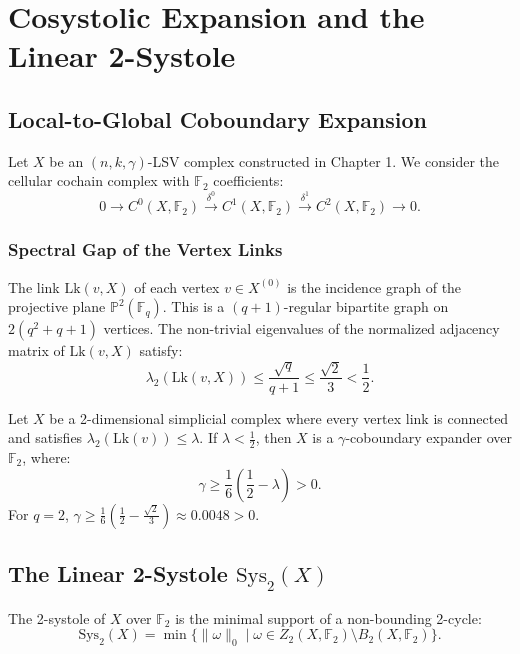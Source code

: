 \chapter{Cosystolic Expansion and the Linear 2-Systole}

\section{Local-to-Global Coboundary Expansion}
Let $X$ be an $(n, k, \gamma)$-LSV complex constructed in Chapter 1. We consider the cellular cochain complex with $\mathbb{F}_2$ coefficients:
\[
0 \longrightarrow C^0(X, \mathbb{F}_2) \xrightarrow{\delta^0} C^1(X, \mathbb{F}_2) \xrightarrow{\delta^1} C^2(X, \mathbb{F}_2) \longrightarrow 0.
\]

\subsection{Spectral Gap of the Vertex Links}
The link $\mathrm{Lk}(v, X)$ of each vertex $v \in X^{(0)}$ is the incidence graph of the projective plane $\mathbb{P}^2(\mathbb{F}_q)$.
This is a $(q+1)$-regular bipartite graph on $2(q^2+q+1)$ vertices.
The non-trivial eigenvalues of the normalized adjacency matrix of $\mathrm{Lk}(v, X)$ satisfy:
\[
\lambda_2(\mathrm{Lk}(v, X)) \le \frac{\sqrt{q}}{q+1} \le \frac{\sqrt{2}}{3} < \frac{1}{2}.
\]

\begin{theorem}
Let $X$ be a 2-dimensional simplicial complex where every vertex link is connected and satisfies $\lambda_2(\mathrm{Lk}(v)) \le \lambda$. 
If $\lambda < \frac{1}{2}$, then $X$ is a $\gamma$-coboundary expander over $\mathbb{F}_2$, where:
\[
\gamma \ge \frac{1}{6} \left( \frac{1}{2} - \lambda \right) > 0.
\]
For $q=2$, $\gamma \ge \frac{1}{6} \left( \frac{1}{2} - \frac{\sqrt{2}}{3} \right) \approx 0.0048 > 0$.
\end{theorem}

\section{The Linear 2-Systole $\mathrm{Sys}_2(X)$}
\begin{definition}
The 2-systole of $X$ over $\mathbb{F}_2$ is the minimal support of a non-bounding 2-cycle:
\[
\mathrm{Sys}_2(X) = \min \{ \|\omega\|_0 \mid \omega \in Z_2(X, \mathbb{F}_2) \setminus B_2(X, \mathbb{F}_2) \}.
\]
\end{definition}

